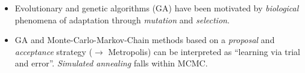 \begin{frame}{\subsubsecname}


\begin{itemize}
\item Evolutionary and genetic algorithms (GA) have been
  motivated by \emph{biological} phenomena of adaptation through
  \emph{mutation} and \emph{selection}.

\vspace{5mm}
  
\item GA and Monte-Carlo-Markov-Chain methods based on a \emph{proposal} and
  \emph{acceptance} strategy ($\rightarrow$ Metropolis) can be interpreted
  as ``learning via trial and error''. \emph{Simulated annealing} falls within MCMC.
\end{itemize}
\end{frame}

